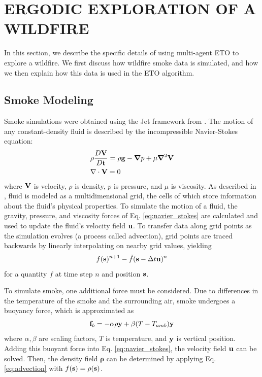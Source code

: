 \documentclass[letterpaper, 10 pt, conference]{ieeeconf}  %
\begin{document}
\section{ERGODIC EXPLORATION OF A WILDFIRE}
In this section, we describe the specific details of using multi-agent ETO to explore a wildfire. We first discuss how wildfire smoke data is simulated, and how we then explain how this data is used in the ETO algorithm.
\subsection{Smoke Modeling}
Smoke simulations were obtained using the Jet framework from \cite{kim2017fluid}. The motion of any constant-density fluid is described by the incompressible Navier-Stokes equation:
\begin{align}\label{eq:navier_stokes}
    & \rho\frac{D\bold{V}}{D\bold{t}} = \rho\bold{g}-\boldsymbol{\nabla}p + \mu\boldsymbol{\nabla}^2\bold{V} \\
    & \nabla\cdot\bold{V}=0 
    \nonumber
\end{align}
where $\bold{V}$ is velocity, $\rho$ is density, $p$ is pressure, and $\mu$ is viscosity. As described in \cite{kim2017fluid}, fluid is modeled as a multidimensional grid, the cells of which store information about the fluid's physical properties. To simulate the motion of a fluid, the gravity, pressure, and viscosity forces of Eq. \eqref{eq:navier_stokes} are calculated and used to update the fluid's velocity field $\bold{u}$. To transfer data along grid points as the simulation evolves (a process called advection), grid points are traced backwards by linearly interpolating on nearby grid values, yielding
\begin{equation}\label{eq:advection}
f(\bold{s})^{n+1} - \Tilde{f}(\bold{s}-\Delta t\bold{u})^n
\end{equation}
for a quantity $f$ at time step $n$ and position $\bold{s}$.

To simulate smoke, one additional force must be considered. Due to differences in the temperature of the smoke and the surrounding air, smoke undergoes a buoyancy force, which is approximated as
\begin{equation}
\bold{f}_{b} = -\alpha\rho\bold{y} + \beta(T-T_{amb})\bold{y}
\end{equation}
where $\alpha, \beta$ are scaling factors, $T$ is temperature, and $\bold{y}$ is vertical position. Adding this buoyant force into Eq. \eqref{eq:navier_stokes}, the velocity field $\bold{u}$ can be solved. Then, the density field $\boldsymbol{\rho}$ can be determined by applying Eq. \eqref{eq:advection} with $f(\bold{s})=\rho(\bold{s})$.
\end{document}
